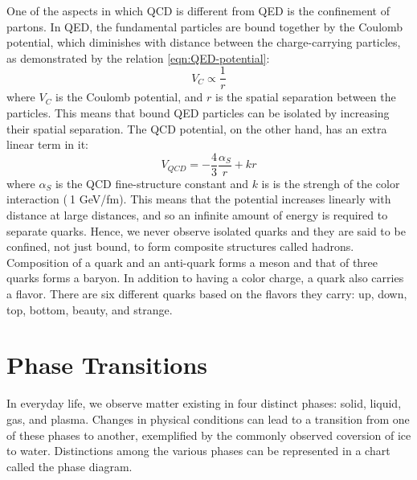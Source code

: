 One of the aspects in which QCD is different from QED is the confinement of partons. In QED, the fundamental particles are bound together by the Coulomb potential, which diminishes with distance between the charge-carrying particles, as demonstrated by the relation \ref{eqn:QED-potential}:
\begin{equation}\label{eqn:QED-potential}
V_{C}\propto\frac{1}{r} 
\end{equation}
where $V_{C}$ is the Coulomb potential, and $r$ is the spatial separation between the particles. This means that bound QED particles can be isolated by increasing their spatial separation. The QCD potential, on the other hand, has an extra linear term in it:
\begin{equation}\label{eqn:QCD-potential}
V_{QCD} = -\frac{4}{3}\frac{\alpha_{S}}{r} + {k}{r} 
\end{equation}
where $\alpha_{S}$ is the QCD fine-structure constant and $k$ is is the strengh of the color interaction ($~$1 GeV/fm). This means that the potential increases linearly with distance at large distances, and so an infinite amount of energy is required to separate quarks. Hence, we never observe isolated quarks and they are said to be confined, not just bound, to form composite structures called hadrons.\cite{0954-3899-32-3-R01} Composition of a quark and an anti-quark forms a meson and that of three quarks forms a baryon. In addition to having a color charge, a quark also carries a flavor. There are six different quarks based on the flavors they carry: up, down, top, bottom, beauty, and strange.


\section{Phase Transitions}
In everyday life, we observe matter existing in four distinct phases: solid, liquid, gas, and plasma. Changes in physical conditions can lead to a transition from one of these phases to another, exemplified by the commonly observed coversion of ice to water. Distinctions among the various phases can be represented in a chart called the phase diagram.

